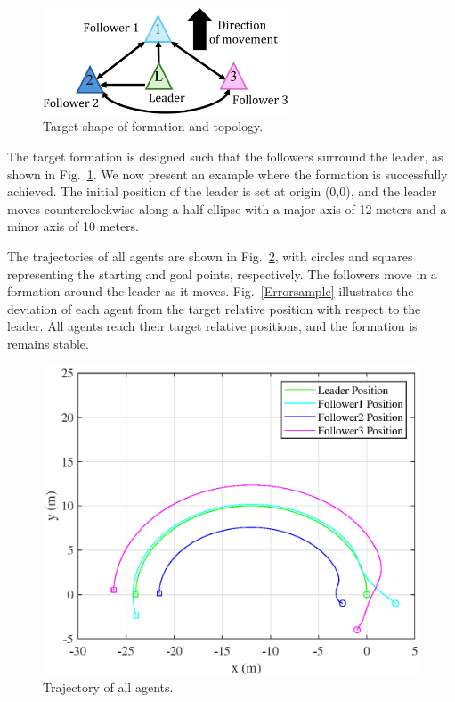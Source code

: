 \documentclass[a4paper,fleqn,10pt,twocolumn]{SICE_ISCS}
\newcommand{\Figref}[1]{{Fig.~\ref{#1}}}
\begin{document}
\begin{figure}[b]
	\begin{center}
		\includegraphics[clip,width=73mm]{Fig/Topology.eps}
		\caption{Target shape of formation and topology.}
		\label{Topology}
	\end{center}
\end{figure}

The target formation is designed such that the followers surround the leader, as shown in \Figref{Topology}. We now present an example where the formation is successfully achieved. The initial position of the leader is set at origin (0,0), and the leader moves counterclockwise along a half-ellipse with a major axis of 12 meters and a minor axis of 10 meters.

The trajectories of all agents are shown in \Figref{Trajectorysample}, with circles and squares representing the starting and goal points, respectively. The followers  move in a formation around the leader as it moves. \Figref{Errorsample} illustrates the deviation of each agent from the target relative position with respect to the leader. All agents reach their target relative positions, and the formation is remains stable.



\begin{figure}[t]
	\begin{center}
		\includegraphics[clip,width=\linewidth]{Fig/sampletrajectry.eps}
		\caption{Trajectory of all agents.}
		\label{Trajectorysample}
	\end{center}
	\vspace{-2mm}
\end{figure}
\end{document}
